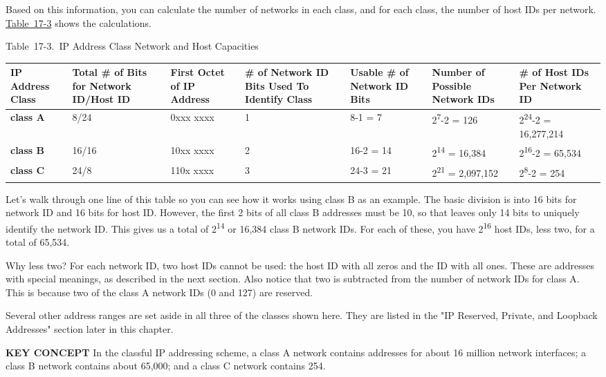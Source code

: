 \documentclass[b5paper,11pt]{memoir}
\begin{document}
Based on this information, you can calculate the number of networks in
each class, and for each class, the number of host IDs per network.
\protect\hyperlink{ch17s03.htmlux5cux23ip_address_class_network_and_host_capaci}{Table~17-3}
shows the calculations.

\protect\hypertarget{ch17s03.htmlux5cux23ip_address_class_network_and_host_capaci}{}{}

Table~17-3.~IP Address Class Network and Host Capacities

\begin{longtable}[]{@{}lllllll@{}}
\toprule
IP Address Class & Total \# of Bits for Network ID/Host ID & First Octet
of IP Address & \# of Network ID Bits Used To Identify Class & Usable \#
of Network ID Bits & Number of Possible Network IDs & \# of Host IDs Per
Network ID\tabularnewline
\midrule
\endhead
{\textbf{class A}} & 8/24 & 0xxx xxxx & 1 & 8-1 = 7 &
2\textsuperscript{7}-2 = 126 & 2\textsuperscript{24}-2 =
16,277,214\tabularnewline
{\textbf{class B}} & 16/16 & 10xx xxxx & 2 & 16-2 = 14 &
2\textsuperscript{14} = 16,384 & 2\textsuperscript{16}-2 =
65,534\tabularnewline
{\textbf{class C}} & 24/8 & 110x xxxx & 3 & 24-3 = 21 &
2\textsuperscript{21} = 2,097,152 & 2\textsuperscript{8}-2 =
254\tabularnewline
\bottomrule
\end{longtable}

Let's walk through one line of this table so you can see how it works
using class B as an example. The basic division is into 16 bits for
network ID and 16 bits for host ID. However, the first 2 bits of all
class B addresses must be 10, so that leaves only 14 bits to uniquely
identify the network ID. This gives us a total of 2\textsuperscript{14}
or 16,384 class B network IDs. For each of these, you have
2\textsuperscript{16} host IDs, less two, for a total of
65,534.\protect\hypertarget{ch17s03.htmlux5cux23idx-CHP-17-0694}{}{}

Why less two? For each network ID, two host IDs cannot be used: the host
ID with all zeros and the ID with all ones. These are addresses with
special meanings, as described in the next section. Also notice that two
is subtracted from the number of network IDs for class A. This is
because two of the class A network IDs (0 and 127) are reserved.

Several other address ranges are set aside in all three of the classes
shown here. They are listed in the "IP Reserved, Private, and Loopback
Addresses" section later in this chapter.


{\textbf{KEY CONCEPT}} In the classful IP addressing scheme, a class A
network contains addresses for about 16 million network interfaces; a
class B network contains about 65,000; and a class C network contains
254.
\end{document}
